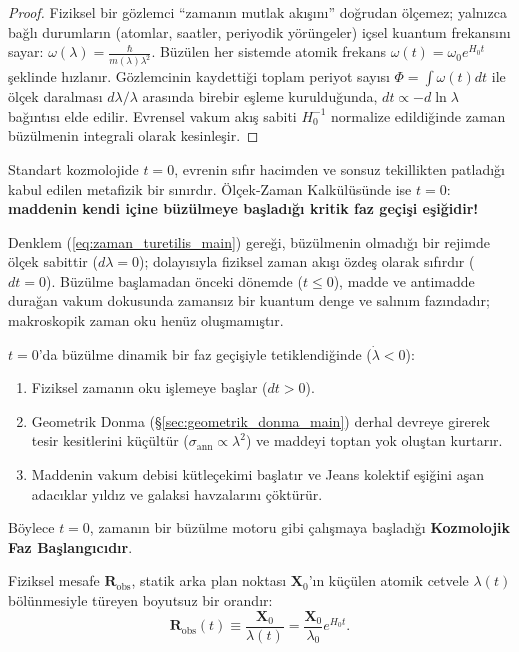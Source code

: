 \begin{proof}
    Fiziksel bir gözlemci ``zamanın mutlak akışını'' doğrudan ölçemez; yalnızca bağlı durumların (atomlar, saatler, periyodik yörüngeler) içsel kuantum frekansını sayar: $\omega(\lambda) = \frac{\hbar}{m(\lambda) \lambda^2}$. Büzülen her sistemde atomik frekans $\omega(t) = \omega_0 e^{H_0 t}$ şeklinde hızlanır. Gözlemcinin kaydettiği toplam periyot sayısı $\Phi = \int \omega(t) dt$ ile ölçek daralması $d\lambda/\lambda$ arasında birebir eşleme kurulduğunda, $dt \propto -d\ln\lambda$ bağıntısı elde edilir. Evrensel vakum akış sabiti $H_0^{-1}$ normalize edildiğinde zaman büzülmenin integrali olarak kesinleşir.
\end{proof}

\begin{corollary}[Evrenin $t = 0$ Anı: Büzülmenin Başlangıcı ve Zamansız Faz Eşiği]
    \label{cor:t_sifir_faz_esigi_main}
    Standart kozmolojide $t = 0$, evrenin sıfır hacimden ve sonsuz tekillikten patladığı kabul edilen metafizik bir sınırdır. Ölçek-Zaman Kalkülüsünde ise $t = 0$: \textbf{maddenin kendi içine büzülmeye başladığı kritik faz geçişi eşiğidir!}

    Denklem (\ref{eq:zaman_turetilis_main}) gereği, büzülmenin olmadığı bir rejimde ölçek sabittir ($d\lambda = 0$); dolayısıyla fiziksel zaman akışı özdeş olarak sıfırdır ($dt = 0$). Büzülme başlamadan önceki dönemde ($t \le 0$), madde ve antimadde durağan vakum dokusunda zamansız bir kuantum denge ve salınım fazındadır; makroskopik zaman oku henüz oluşmamıştır.

    $t = 0$'da büzülme dinamik bir faz geçişiyle tetiklendiğinde ($\dot{\lambda} < 0$):
    \begin{enumerate}
        \item Fiziksel zamanın oku işlemeye başlar ($dt > 0$).
        \item Geometrik Donma (\S\ref{sec:geometrik_donma_main}) derhal devreye girerek tesir kesitlerini küçültür ($\sigma_{\mathrm{ann}} \propto \lambda^2$) ve maddeyi toptan yok oluştan kurtarır.
        \item Maddenin vakum debisi kütleçekimi başlatır ve Jeans kolektif eşiğini aşan adacıklar yıldız ve galaksi havzalarını çöktürür.
    \end{enumerate}
    Böylece $t = 0$, zamanın bir büzülme motoru gibi çalışmaya başladığı \textbf{Kozmolojik Faz Başlangıcıdır}.
\end{corollary}

\begin{theorem}[Konum, Uzaklık ve Boşluğun Türetilişi: Uzaklık = Büzülen Cetvel Sayımı]
    \label{thm:konum_uzaklik_turetilis_main}
    Fiziksel mesafe $\mathbf{R}_{\mathrm{obs}}$, statik arka plan noktası $\mathbf{X}_0$'ın küçülen atomik cetvele $\lambda(t)$ bölünmesiyle türeyen boyutsuz bir orandır:
    \begin{equation}
        \mathbf{R}_{\mathrm{obs}}(t) \equiv \frac{\mathbf{X}_0}{\lambda(t)} = \frac{\mathbf{X}_0}{\lambda_0} e^{H_0 t}.
        \label{eq:konum_turetilis_main}
    \end{equation}
\end{theorem}

